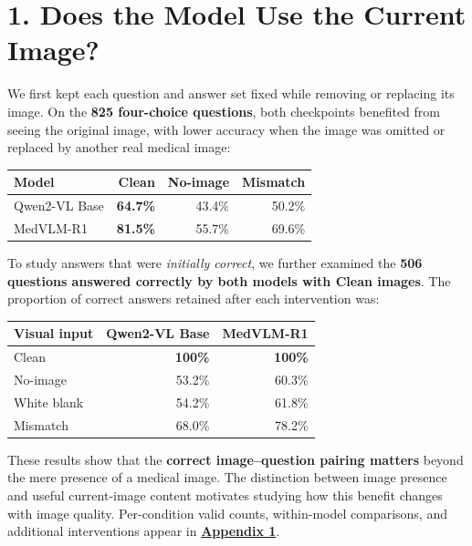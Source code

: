\documentclass[
  10pt,
  a4paper,
]{article}
\newcounter{none} %
\begin{document}
\section{1. Does the Model Use the Current
Image?}\label{does-the-model-use-the-current-image}

We first kept each question and answer set fixed while removing or
replacing its image. On the \textbf{825 four-choice questions}, both
checkpoints benefited from seeing the original image, with lower
accuracy when the image was omitted or replaced by another real medical
image:

{\def\LTcaptype{none} %
\begin{longtable}[]{@{}lrrr@{}}
\toprule\noalign{}
Model & Clean & No-image & Mismatch \\
\midrule\noalign{}
\endhead
\bottomrule\noalign{}
\endlastfoot
Qwen2-VL Base & \textbf{64.7\%} & 43.4\% & 50.2\% \\
MedVLM-R1 & \textbf{81.5\%} & 55.7\% & 69.6\% \\
\end{longtable}
}

To study answers that were \emph{initially correct}, we further examined
the \textbf{506 questions answered correctly by both models with Clean
images}. The proportion of correct answers retained after each
intervention was:

{\def\LTcaptype{none} %
\begin{longtable}[]{@{}lrr@{}}
\toprule\noalign{}
Visual input & Qwen2-VL Base & MedVLM-R1 \\
\midrule\noalign{}
\endhead
\bottomrule\noalign{}
\endlastfoot
Clean & \textbf{100\%} & \textbf{100\%} \\
No-image & 53.2\% & 60.3\% \\
White blank & 54.2\% & 61.8\% \\
Mismatch & 68.0\% & 78.2\% \\
\end{longtable}
}

These results show that the \textbf{correct image--question pairing
matters} beyond the mere presence of a medical image. The distinction
between image presence and useful current-image content motivates
studying how this benefit changes with image quality. Per-condition
valid counts, within-model comparisons, and additional interventions
appear in
\textbf{\hyperref[appendix-1.-behavioral-evidence-for-reliance-on-the-current-image]{Appendix
1}}.
\end{document}
